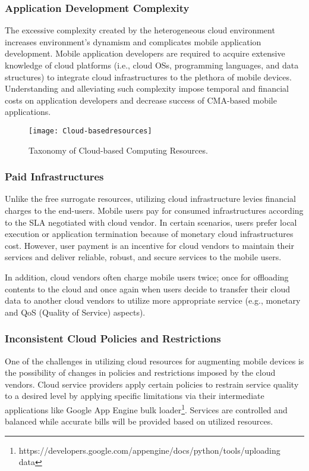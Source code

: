 \documentclass[publish]{IEEEtran}
\begin{document}
\subsubsection{Application Development Complexity}
The excessive complexity created by the heterogeneous cloud environment increases environment's dynamism and complicates mobile application development. Mobile application developers are required to acquire extensive knowledge of cloud platforms (i.e., cloud OSs, programming languages, and data structures) to integrate cloud infrastructures to the plethora of mobile devices. Understanding and alleviating such complexity impose temporal and financial costs on application developers and decrease success of CMA-based mobile applications.
\begin{figure*}[t]
\centering
\texttt{[image: Cloud-basedresources]}
\caption{Taxonomy of Cloud-based Computing Resources.}
\label{fig:Cloud-basedresources}
\end{figure*}
\subsubsection{Paid Infrastructures}
Unlike the free surrogate resources, utilizing cloud infrastructure levies financial charges to the end-users. Mobile users pay for consumed infrastructures according to the SLA negotiated with cloud vendor. In certain scenarios, users prefer local execution or application termination because of monetary cloud infrastructures cost. However, user payment is an incentive for cloud vendors to maintain their services and deliver reliable, robust, and secure services to the mobile users.

In addition, cloud vendors often charge mobile users twice; once for offloading contents to the cloud and once again when users decide to transfer their cloud data to another cloud vendors to utilize more appropriate service (e.g., monetary and QoS (Quality of Service) aspects). 

\subsubsection{Inconsistent Cloud Policies and Restrictions}
One of the challenges in utilizing cloud resources for augmenting mobile devices is the possibility of changes in policies and restrictions imposed by the cloud vendors. Cloud service providers apply certain policies to restrain service quality to a desired level by applying specific limitations via their intermediate applications like Google App Engine bulk loader\footnote{https://developers.google.com/appengine/docs/python/tools/uploading data}. Services are controlled and balanced while accurate bills will be provided based on utilized resources. 
\end{document}
